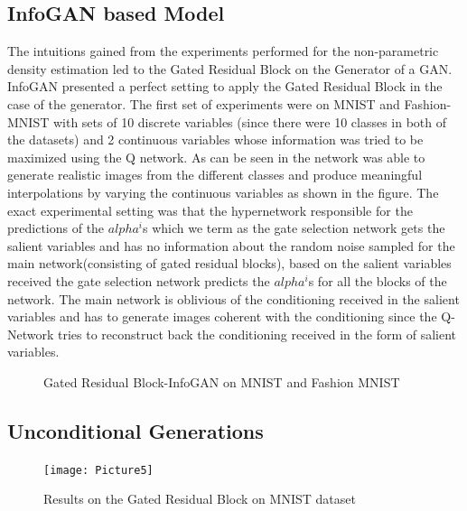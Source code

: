 \subsection{InfoGAN based Model}
The intuitions gained from the experiments performed for the non-parametric density estimation led to the Gated Residual Block on the Generator of a GAN. InfoGAN \cite{chen2016infogan} presented a perfect setting to apply the Gated Residual Block in the case of the generator. The first set of experiments were on MNIST and Fashion-MNIST with sets of 10 discrete variables (since there were 10 classes in both of the datasets) and 2 continuous variables whose information was tried to be maximized using the Q network. As can be seen in  the network was able to generate realistic images from the different classes and produce meaningful interpolations by varying the continuous variables as shown in the figure. The exact experimental setting was that the hypernetwork responsible for the predictions of the $alpha^i$s which we term as the gate selection network gets the salient variables and has no information about the random noise sampled for the main network(consisting of gated residual blocks), based on the salient variables received the gate selection network predicts the  $alpha^i$s for all the blocks of the network. The main network is oblivious of the conditioning received in the salient variables and has to generate images coherent with the conditioning since the Q-Network tries to reconstruct back the conditioning received in the form of salient variables. 

\begin{figure}[t]%
    \centering
    \caption{Gated Residual Block-InfoGAN on MNIST and Fashion MNIST }
    \label{fig:infogan_unconditional}
    \vspace{-3mm}
\end{figure}

\subsection{Unconditional Generations}
\begin{figure}[t]
    \centering
    \texttt{[image: Picture5]}
    \caption{Results on the Gated Residual Block on MNIST dataset}\label{fig:grb_mnist}
    \vspace{-4mm}
\end{figure}

